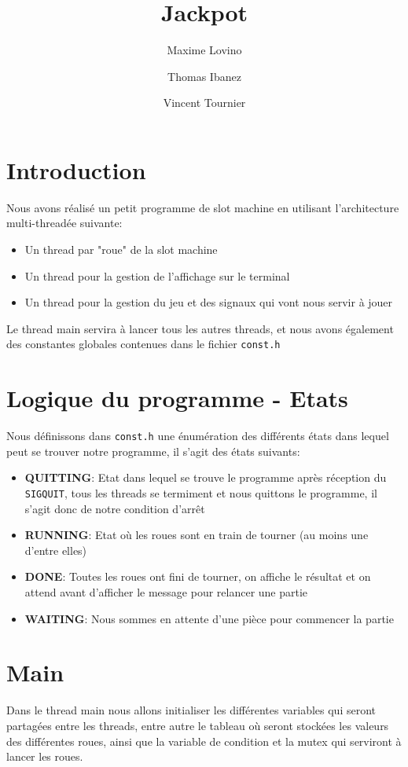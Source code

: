 \documentclass[a4paper]{article}
\title{Jackpot}
\author{Maxime Lovino \and Thomas Ibanez \and Vincent Tournier}
\begin{document}
\maketitle
\newpage
\section{Introduction}
Nous avons réalisé un petit programme de slot machine en utilisant l'architecture multi-threadée suivante:
\begin{itemize}
	\item Un thread par "roue" de la slot machine
	\item Un thread pour la gestion de l'affichage sur le terminal
	\item Un thread pour la gestion du jeu et des signaux qui vont nous servir à jouer
\end{itemize}
Le thread main servira à lancer tous les autres threads, et nous avons également des constantes globales contenues dans le fichier \verb+const.h+
\section{Logique du programme - Etats}
Nous définissons dans \verb+const.h+ une énumération des différents états dans lequel peut se trouver notre programme, il s'agit des états suivants: \\
\begin{itemize}
	\item \textbf{QUITTING}: Etat dans lequel se trouve le programme après réception du \verb+SIGQUIT+, tous les threads se termiment et nous quittons le programme, il s'agit donc de notre condition d'arrêt
	\item \textbf{RUNNING}: Etat où les roues sont en train de tourner (au moins une d'entre elles)
	\item \textbf{DONE}: Toutes les roues ont fini de tourner, on affiche le résultat et on attend avant d'afficher le message pour relancer une partie
	\item \textbf{WAITING}: Nous sommes en attente d'une pièce pour commencer la partie
\end{itemize}
\section{Main}
Dans le thread main nous allons initialiser les différentes variables qui seront partagées entre les threads, entre autre le tableau où seront stockées les valeurs des différentes roues, ainsi que la variable de condition et la mutex qui serviront à lancer les roues.\\
\end{document}

